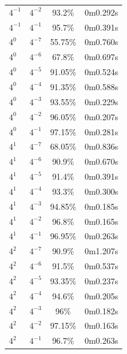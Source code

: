 \documentclass[]{report}
\begin{document}
\begin{center}
\begin{tabular}{l|l|c|c}
			 $4^{-1}$ & $4^{-2}$   & 93.2\%                              & 0m0.292s         \\
			 $4^{-1}$ & $4^{-1}$   & 95.7\%                              & 0m0.391s         \\
			 $4^{0}$  & $4^{-7}$   & 55.75\%                             & 0m0.760s         \\
			 $4^{0}$  & $4^{-6}$   & 67.8\%                              & 0m0.697s         \\
			 $4^{0}$  & $4^{-5}$   & 91.05\%                             & 0m0.524s         \\
			 $4^{0}$  & $4^{-4}$   & 91.35\%                             & 0m0.588s         \\
			 $4^{0}$  & $4^{-3}$   & 93.55\%                             & 0m0.229s         \\
			 $4^{0}$  & $4^{-2}$   & 96.05\%                             & 0m0.207s         \\
			 $4^{0}$  & $4^{-1}$   & 97.15\%                             & 0m0.281s         \\
			 $4^{1}$  & $4^{-7}$   & 68.05\%                             & 0m0.836s         \\
			 $4^{1}$  & $4^{-6}$   & 90.9\%                              & 0m0.670s         \\
			 $4^{1}$  & $4^{-5}$   & 91.4\%                              & 0m0.391s         \\
			 $4^{1}$  & $4^{-4}$   & 93.3\%                              & 0m0.300s         \\
			 $4^{1}$  & $4^{-3}$   & 94.85\%                             & 0m0.185s         \\
			 $4^{1}$  & $4^{-2}$   & 96.8\%                              & 0m0.165s         \\
			 $4^{1}$  & $4^{-1}$   & 96.95\%                             & 0m0.263s         \\
			 $4^{2}$  & $4^{-7}$   & 90.9\%                              & 0m1.207s         \\
			 $4^{2}$  & $4^{-6}$   & 91.5\%                              & 0m0.537s         \\
			 $4^{2}$  & $4^{-5}$   & 93.35\%                             & 0m0.237s         \\
			 $4^{2}$  & $4^{-4}$   & 94.6\%                              & 0m0.205s         \\
			 $4^{2}$  & $4^{-3}$   & 96\%                                & 0m0.182s         \\
			 $4^{2}$  & $4^{-2}$   & 97.15\%                             & 0m0.163s         \\
			 $4^{2}$  & $4^{-1}$   & 96.7\%                              & 0m0.263s         \\
			 \hline
			\end{tabular}


\end{center}
\end{document}
